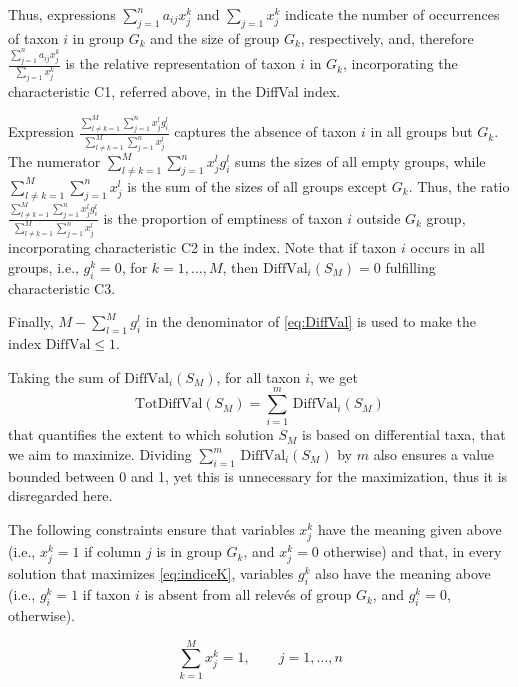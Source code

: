 Thus, expressions \(\sum_{j=1}^n a_{ij} x_j^k\) and \(\sum_{j=1}x_j^k\) indicate the number of occurrences of taxon \(i\) in group \(G_k\) and the size of group \(G_k\), respectively, and, therefore \(\frac{\sum_{j=1}^n a_{ij} x_j^k}{\sum_{j=1}x_j^k}\) is the relative representation of taxon \(i\) in \(G_k\), incorporating the characteristic C1, referred above, in the DiffVal index.

Expression \(\frac{\sum_{l\not=k=1}^M\sum_{j=1}^n  x_j^l g_i^l} {\sum_{l\not=k=1}^M\sum_{j=1}^n x_j^l}\) captures the absence of taxon \(i\) in all groups but \(G_k\). The numerator \(\sum_{l\not=k=1}^M\sum_{j=1}^n  x_j^l g_i^l\) sums the sizes of all empty groups, while \(\sum_{l\not=k=1}^M\sum_{j=1}^n  x_j^l\) is the sum of the sizes of all groups except \(G_k\). Thus, the ratio \(\frac{\sum_{l\not=k=1}^M\sum_{j=1}^n  x_j^l g_i^l} {\sum_{l\not=k=1}^M\sum_{j=1}^n x_j^l}\) is the proportion of emptiness of taxon \(i\) outside \(G_k\) group, incorporating characteristic C2 in the index. Note that if taxon \(i\) occurs in all groups, i.e., \(g_i^k=0\), for \(k=1,\dots,M\), then \(\mathrm{DiffVal}_i(S_M)=0\) fulfilling characteristic C3.

Finally, \({M-\sum_{l=1}^M g_i^l}\) in the denominator of \eqref{eq:DiffVal} is used to make the index \(\mathrm{DiffVal}\leq 1\).

Taking the sum of \(\mathrm{DiffVal}_i(S_M)\), for all taxon \(i\), we get
\begin{equation}
\mathrm{TotDiffVal}(S_M)= \sum_{i=1}^m \, \mathrm{DiffVal}_i(S_M)
\label{eq:indiceK}
\end{equation}
that quantifies the extent to which solution \(S_M\) is based on differential taxa, that we aim to maximize. Dividing \(\sum_{i=1}^m \, \mathrm{DiffVal}_i(S_M)\) by \(m\) also ensures a value bounded between 0 and 1, yet this is unnecessary for the maximization, thus it is disregarded here.

The following constraints ensure that variables \(x_j^k\) have the meaning given above (i.e., \(x_j^k=1\) if column \(j\) is in group \(G_k\), and \(x_j^k=0\) otherwise) and that, in every solution that maximizes \eqref{eq:indiceK}, variables \(g_i^k\) also have the meaning above (i.e., \(g_i^k=1\) if taxon \(i\) is absent from all relevés of group \(G_k\), and \(g_i^k=0\), otherwise).

\begin{equation}
\sum_{k=1}^M x_j^k=1, \quad \quad j=1,\dots,n
\label{eq:kpartition1}
\end{equation}

